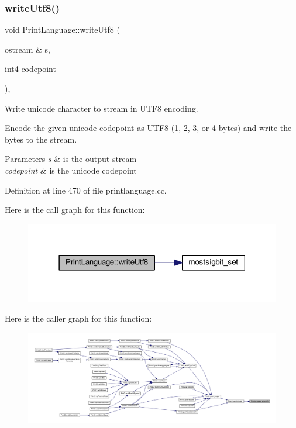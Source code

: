 \subsubsection{\texorpdfstring{writeUtf8()}{writeUtf8()}}
{\footnotesize\ttfamily void Print\+Language\+::write\+Utf8 (\begin{DoxyParamCaption}\item[{ostream \&}]{s,  }\item[{int4}]{codepoint }\end{DoxyParamCaption})\hspace{0.3cm}{\ttfamily [static]}, {\ttfamily [protected]}}



Write unicode character to stream in U\+T\+F8 encoding. 

Encode the given unicode codepoint as U\+T\+F8 (1, 2, 3, or 4 bytes) and write the bytes to the stream. 
\begin{DoxyParams}{Parameters}
{\em s} & is the output stream \\
\hline
{\em codepoint} & is the unicode codepoint \\
\hline
\end{DoxyParams}


Definition at line 470 of file printlanguage.\+cc.

Here is the call graph for this function\+:
\nopagebreak
\begin{figure}[H]
\begin{center}
\leavevmode
\includegraphics[width=318pt]{class_print_language_af6dd42fe3c5f9941b50b06c0dfeda80c_cgraph}
\end{center}
\end{figure}
Here is the caller graph for this function\+:
\nopagebreak
\begin{figure}[H]
\begin{center}
\leavevmode
\includegraphics[width=350pt]{class_print_language_af6dd42fe3c5f9941b50b06c0dfeda80c_icgraph}
\end{center}
\end{figure}


